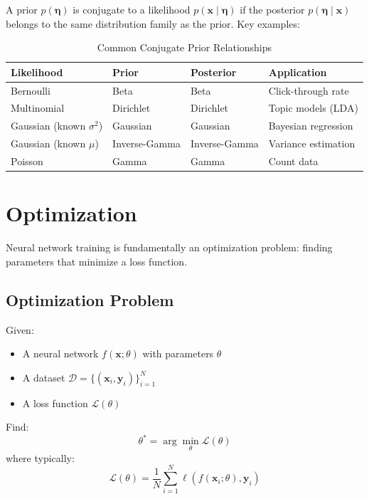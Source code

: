 \begin{property}
A prior $p(\boldsymbol{\eta})$ is conjugate to a likelihood $p(\mathbf{x} \mid \boldsymbol{\eta})$ if the posterior $p(\boldsymbol{\eta} \mid \mathbf{x})$ belongs to the same distribution family as the prior. Key examples:
\end{property}

\begin{table}[ht]
    \centering
    \caption{Common Conjugate Prior Relationships}
    \begin{tabular}{L{2.5cm} L{2.5cm} L{2.5cm} L{3cm}}
        \toprule
        \textbf{Likelihood} & \textbf{Prior} & \textbf{Posterior} & \textbf{Application} \\
        \midrule
        Bernoulli & Beta & Beta & Click-through rate \\
        Multinomial & Dirichlet & Dirichlet & Topic models (LDA) \\
        Gaussian (known $\sigma^2$) & Gaussian & Gaussian & Bayesian regression \\
        Gaussian (known $\mu$) & Inverse-Gamma & Inverse-Gamma & Variance estimation \\
        Poisson & Gamma & Gamma & Count data \\
        \bottomrule
    \end{tabular}
\end{table}

\section{Optimization}

Neural network training is fundamentally an optimization problem: finding parameters that minimize a loss function.

\subsection{Optimization Problem}

\begin{problem}
Given:
\begin{itemize}
    \item A neural network $f(\mathbf{x}; \theta)$ with parameters $\theta$
    \item A dataset $\mathcal{D} = \{(\mathbf{x}_i, \mathbf{y}_i)\}_{i=1}^{N}$
    \item A loss function $\mathcal{L}(\theta)$
\end{itemize}
Find:
\begin{equation}
\theta^* = \arg\min_{\theta} \mathcal{L}(\theta)
\end{equation}
where typically:
\begin{equation}
\mathcal{L}(\theta) = \frac{1}{N}\sum_{i=1}^{N} \ell(f(\mathbf{x}_i; \theta), \mathbf{y}_i)
\end{equation}
\end{problem}

